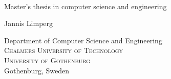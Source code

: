 
\begin{titlepage}
			
\addtolength{\voffset}{2cm}

\mbox{}
\vfill
\renewcommand{\familydefault}{\sfdefault} \normalfont %

\textbf{\Huge \multiLineTitle{0.2cm}} 
\\[0.5cm]


Master's thesis in computer science and engineering \setlength{\parskip}{1cm}

{\Large Jannis Limperg} \setlength{\parskip}{2.9cm}

Department of Computer Science and Engineering \\
\textsc{Chalmers University of Technology} \\
\textsc{University of Gothenburg} \\
Gothenburg, Sweden \the\year

\renewcommand{\familydefault}{\rmdefault} \normalfont %
\end{titlepage}


\newpage
\restoregeometry
\thispagestyle{empty}
\mbox{}


